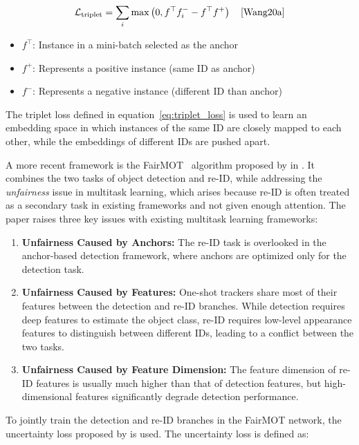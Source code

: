 \begin{equation}
    \label{eq:triplet_loss}
    \mathcal{L}_{\text{triplet}}=\sum_i \max \left(0, f^{\top} f_i^{-}-f^{\top} f^{+}\right)
    \quad\text{\cite[Eq.~1]{Wang20a}}
\end{equation}

\begin{itemize}
    \item \(f^{\top}\): Instance in a mini-batch selected as the anchor
    \item \(f^{+}\): Represents a positive instance (same ID as anchor)
    \item \(f^{-}\): Represents a negative instance (different ID than anchor)
\end{itemize}

The triplet loss defined in equation~\ref{eq:triplet_loss} is used to learn an embedding space in which instances of the same ID are closely mapped to each other, while the embeddings of different IDs are pushed apart.

A more recent framework is the FairMOT~\cite{Zhang21} algorithm proposed by \citeauthor{Zhang21} in \citeyear{Zhang21}. It combines the two tasks of object detection and re-ID, while addressing the \textit{unfairness} issue in multitask learning, which arises because re-ID is often treated as a secondary task in existing frameworks and not given enough attention. The paper raises three key issues with existing multitask learning frameworks:

\begin{enumerate}
    \item \textbf{Unfairness Caused by Anchors:} The re-ID task is overlooked in the anchor-based detection framework, where anchors are optimized only for the detection task.
    \item \textbf{Unfairness Caused by Features:} One-shot trackers share most of their features between the detection and re-ID branches. While detection requires deep features to estimate the object class, re-ID requires low-level appearance features to distinguish between different IDs, leading to a conflict between the two tasks.
    \item \textbf{Unfairness Caused by Feature Dimension:} The feature dimension of re-ID features is usually much higher than that of detection features, but high-dimensional features significantly degrade detection performance.
\end{enumerate}

To jointly train the detection and re-ID branches in the FairMOT network, the uncertainty loss proposed by \textcite{Cipolla18} is used. The uncertainty loss is defined as:


